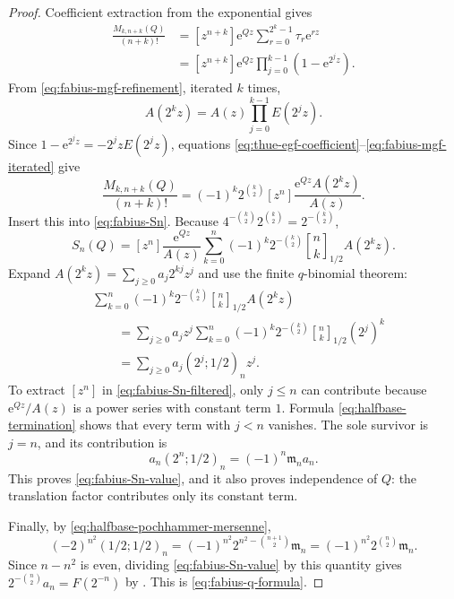 \documentclass[11pt,oneside,openany]{book}
\theoremstyle{definition}
\theoremstyle{remark}
\newcommand{\Qbinom}[3]{\genfrac{[}{]}{0pt}{}{#1}{#2}_{#3}}
\newcommand{\e}{\mathrm e}
\begin{document}
\begin{proof}
Coefficient extraction from the exponential gives
\begin{align}
 \frac{M_{k,n+k}(Q)}{(n+k)!}
 &=[z^{n+k}]\e^{Qz}
   \sum_{r=0}^{2^k-1}\tau_r\e^{rz}\\
 &=[z^{n+k}]\e^{Qz}
   \prod_{j=0}^{k-1}(1-\e^{2^jz}).\label{eq:thue-egf-coefficient}
\end{align}
From \eqref{eq:fabius-mgf-refinement}, iterated $k$ times,
\begin{equation}
 A(2^kz)=A(z)\prod_{j=0}^{k-1}E(2^jz).\label{eq:fabius-mgf-iterated}
\end{equation}
Since $1-\e^{2^jz}=-2^jzE(2^jz)$, equations \eqref{eq:thue-egf-coefficient}--\eqref{eq:fabius-mgf-iterated} give
\begin{equation}
 \frac{M_{k,n+k}(Q)}{(n+k)!}
 =(-1)^k2^{\binom k2}
 [z^n]\frac{\e^{Qz}A(2^kz)}{A(z)}.\label{eq:thue-fabius-coefficient}
\end{equation}
Insert this into \eqref{eq:fabius-Sn}.  Because
$4^{-\binom k2}2^{\binom k2}=2^{-\binom k2}$,
\begin{equation}
 S_n(Q)=[z^n]\frac{\e^{Qz}}{A(z)}
 \sum_{k=0}^n(-1)^k2^{-\binom k2}
 \Qbinom nk{1/2}A(2^kz).\label{eq:fabius-Sn-filtered}
\end{equation}
Expand $A(2^kz)=\sum_{j\ge0}a_j2^{kj}z^j$ and use the finite $q$-binomial theorem:
\begin{align}
 &\sum_{k=0}^n(-1)^k2^{-\binom k2}
 \Qbinom nk{1/2}A(2^kz)\\
 &\qquad=\sum_{j\ge0}a_jz^j
 \sum_{k=0}^n(-1)^k2^{-\binom k2}
 \Qbinom nk{1/2}(2^j)^k\\
 &\qquad=\sum_{j\ge0}a_j(2^j;1/2)_nz^j.\label{eq:fabius-mode-filter}
\end{align}
To extract $[z^n]$ in \eqref{eq:fabius-Sn-filtered}, only $j\le n$ can contribute because $\e^{Qz}/A(z)$ is a power series with constant term $1$.  Formula \eqref{eq:halfbase-termination} shows that every term with $j<n$ vanishes.  The sole survivor is $j=n$, and its contribution is
\[
 a_n(2^n;1/2)_n=(-1)^n\mathfrak m_na_n.
\]
This proves \eqref{eq:fabius-Sn-value}, and it also proves independence of $Q$: the translation factor contributes only its constant term.

Finally, by \eqref{eq:halfbase-pochhammer-mersenne},
\[
 (-2)^{n^2}(1/2;1/2)_n
 =(-1)^{n^2}2^{n^2-\binom{n+1}{2}}\mathfrak m_n
 =(-1)^{n^2}2^{\binom n2}\mathfrak m_n.
\]
Since $n-n^2$ is even, dividing \eqref{eq:fabius-Sn-value} by this quantity gives
$2^{-\binom n2}a_n=F(2^{-n})$ by .  This is \eqref{eq:fabius-q-formula}.
\end{proof}
\end{document}
